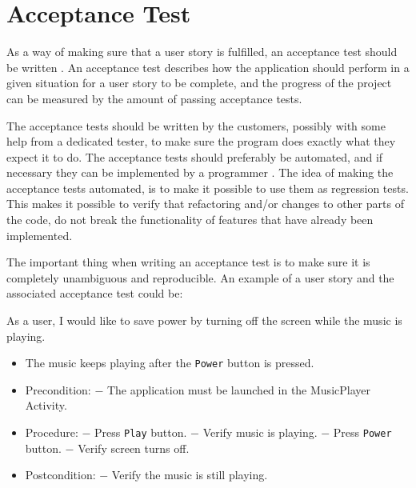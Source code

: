 \section{Acceptance Test}
As a way of making sure that a user story is fulfilled, an acceptance test should be written \citet[p. 126]{xp:explored}. An acceptance test describes how the application should perform in a given situation for a user story to be complete, and the progress of the project can be measured by the amount of passing acceptance tests.

The acceptance tests should be written by the customers, possibly with some help from a dedicated tester, to make sure the program does exactly what they expect it to do. The acceptance tests should preferably be automated, and if necessary they can be implemented by a programmer \citet[p. 126]{xp:explored}. The idea of making the acceptance tests automated, is to make it possible to use them as regression tests. This makes it possible to verify that refactoring and/or changes to other parts of the code, do not break the functionality of features that have already been implemented.

The important thing when writing an acceptance test is to make sure it is completely unambiguous and reproducible. An example of a user story and the associated acceptance test could be:

{As a user, I would like to save power by turning off the screen while the music is playing.}
{\begin{itemize}
\item The music keeps playing after the \texttt{Power} button is pressed.
\end{itemize}}
{\begin{itemize}
\item Precondition: 
\subitem $-$ The application must be launched in the MusicPlayer Activity.

\item Procedure:
\subitem $-$ Press \texttt{Play} button.
\subitem $-$ Verify music is playing.
\subitem $-$ Press \texttt{Power} button.
\subitem $-$ Verify screen turns off.

\item Postcondition:
\subitem $-$ Verify the music is still playing.
\end{itemize}}


